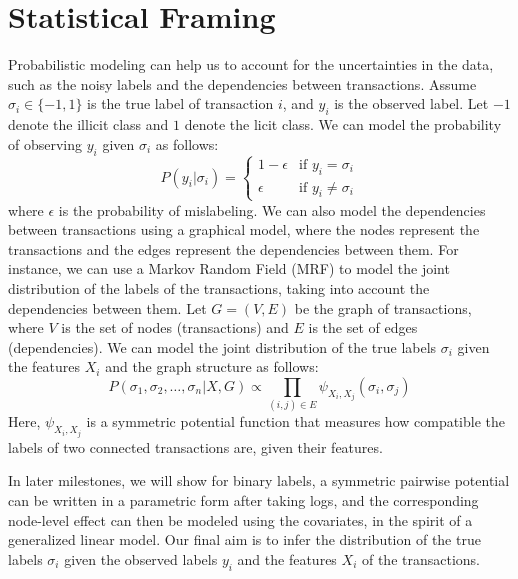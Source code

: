 \documentclass[12pt]{amsart}
\begin{document}
\section{Statistical Framing}
Probabilistic modeling can help us to account for the uncertainties in the data, such as the noisy labels and the dependencies between transactions. Assume $\sigma_i \in \{-1, 1\}$ is the true label of transaction $i$, and $y_i$ is the observed label. Let $-1$ denote the illicit class and $1$ denote the licit class. We can model the probability of observing $y_i$ given $\sigma_i$ as follows:
\begin{equation}P(y_i | \sigma_i) = \begin{cases}
        1 - \epsilon & \text{if } y_i = \sigma_i    \\
        \epsilon     & \text{if } y_i \neq \sigma_i
    \end{cases}\end{equation}
where $\epsilon$ is the probability of mislabeling. We can also model the dependencies between transactions using a graphical model, where the nodes represent the transactions and the edges represent the dependencies between them. For instance, we can use a Markov Random Field (MRF) to model the joint distribution of the labels of the transactions, taking into account the dependencies between them. Let $G = (V, E)$ be the graph of transactions, where $V$ is the set of nodes (transactions) and $E$ is the set of edges (dependencies). We can model the joint distribution of the true labels $\sigma_i$ given the features $X_i$ and the graph structure as follows:
\begin{equation}
    P(\sigma_1, \sigma_2, \ldots, \sigma_n | X,G) \propto \prod_{(i,j) \in E} \psi_{X_i, X_j}(\sigma_i, \sigma_j)
\end{equation}
Here, $\psi_{X_i,X_j}$ is a symmetric potential function that measures how compatible the labels of two connected transactions are, given their features.

In later milestones, we will show for binary labels, a symmetric pairwise potential can be written in a parametric form after taking logs, and the corresponding node-level effect can then be modeled using the covariates, in the spirit of a generalized linear model. Our final aim is to infer the distribution of the true labels $\sigma_i$ given the observed labels $y_i$ and the features $X_i$ of the transactions.
\end{document}
